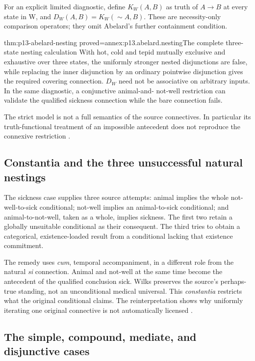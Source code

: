 For an explicit limited diagnostic, define
\(K_W(A,B)\) as truth of \(A\to B\) at every state in W,
and \(D_W(A,B)=K_W(\sim A,B)\).
These are necessity-only comparison operators; they omit
Abelard's further containment condition.

\begin{hblemma}{thm:p13-abelard-nesting}
 {proved=annex:p13.abelard.nesting}{The complete three-state nesting calculation}
With hot, cold and tepid mutually exclusive and exhaustive
over three states, the uniformly stronger nested disjunctions
are false, while replacing the inner disjunction by an
ordinary pointwise disjunction gives the required covering
connection. \(D_W\) need not be associative on arbitrary
inputs. In the same diagnostic, a conjunctive animal-and-
not-well restriction can validate the qualified sickness
connection while the bare connection fails.
\end{hblemma}

The strict model is not a full semantics of the source
connectives. In particular its truth-functional treatment
of an impossible antecedent does not reproduce the
connexive restriction
\cite[pp.~135--138]{Wilks2007FordhamAbelard}.

\subsection{Constantia and the three unsuccessful natural nestings}

The sickness case supplies three source attempts:
animal implies the whole not-well-to-sick conditional;
not-well implies an animal-to-sick conditional;
and animal-to-not-well, taken as a whole, implies sickness.
The first two retain a globally unsuitable conditional as
their consequent. The third tries to obtain a categorical,
existence-loaded result from a conditional lacking that
existence commitment.

The remedy uses \emph{cum}, temporal accompaniment,
in a different role from the natural \emph{si} connection.
Animal and not-well at the same time become the antecedent
of the qualified conclusion sick. Wilks preserves the
source's perhaps-true standing, not an unconditional
medical universal. This \emph{constantia} restricts what
the original conditional claims.
The reinterpretation shows why uniformly iterating one
original connective is not automatically licensed
\cite[pp.~138--140]{Wilks2007FordhamAbelard}.

\subsection{The simple, compound, mediate, and disjunctive cases}

